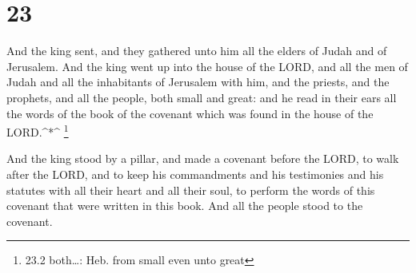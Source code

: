 \hypertarget{section-22}{%
\section{23}\label{section-22}}

 And the king sent, and they gathered unto him all the
elders of Judah and of Jerusalem.  And the king went up into
the house of the LORD, and all the men of Judah and all the inhabitants
of Jerusalem with him, and the priests, and the prophets, and all the
people, both small and great: and he read in their ears all the words of
the book of the covenant which was found in the house of the
LORD.\^{}*\^{} \footnote{23.2 both\ldots: Heb. from small even unto
  great}

 And the king stood by a pillar, and made a covenant before
the LORD, to walk after the LORD, and to keep his commandments and his
testimonies and his statutes with all their heart and all their soul, to
perform the words of this covenant that were written in this book. And
all the people stood to the covenant.

